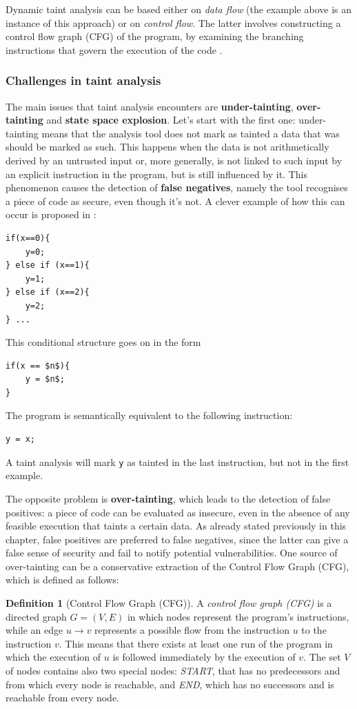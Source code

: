 \documentclass[12pt,a4paper]{book}
\theoremstyle{definition}
\newtheorem{defn}{Definition}
\begin{document}
	Dynamic taint analysis can be based either on \textit{data flow} (the example above is an instance of this approach) or on \textit{control flow}. The latter involves constructing a control flow graph (CFG) of the program, by examining the branching instructions that govern the execution of the code \cite{Dai2018}.
	
	\subsubsection{Challenges in taint analysis}
	The main issues that taint analysis encounters are \textbf{under-tainting}, \textbf{over-tainting} and \textbf{state space explosion}. Let's start with the first one: under-tainting means that the analysis tool does not mark as tainted a data that was should be marked as such. This happens when the data is not arithmetically derived by an untrusted input or, more generally, is not linked to such input by an explicit instruction in the program, but is still influenced by it. This phenomenon causes the detection of \textbf{false negatives}, namely the tool recognises a piece of code as secure, even though it's not. A clever example of how this can occur is proposed in \cite{Newsome2005}:
	\begin{lstlisting}
if(x==0){
	y=0;
} else if (x==1){
	y=1;
} else if (x==2){
	y=2;
} ...
	\end{lstlisting}
	This conditional structure goes on in the form
\begin{lstlisting}[mathescape=true]
if(x == $n$){
	y = $n$;
}
\end{lstlisting}
	The program is semantically equivalent to the following instruction:
	\begin{lstlisting}
y = x;
	\end{lstlisting}
	A taint analysis will mark \texttt{y} as tainted in the last instruction, but not in the first example.
	
	The opposite problem is \textbf{over-tainting}, which leads to the detection of false positives: a piece of code can be evaluated as insecure, even in the absence of any feasible execution that taints a certain data. As already stated previously in this chapter, false positives are preferred to false negatives, since the latter can give a false sense of security and fail to notify potential vulnerabilities. One source of over-tainting can be a conservative extraction of the Control Flow Graph (CFG), which is defined as follows:
	\begin{defn}[Control Flow Graph (CFG)]
		A \textit{control flow graph (CFG)} is a directed graph $G=(V,E)$ in which nodes represent the program's instructions, while an edge $u \rightarrow v$ represents a possible flow from the instruction $u$ to the instruction $v$. This means that there exists at least one run of the program in which the execution of $u$ is followed immediately by the execution of $v$. The set $V$ of nodes contains also two special nodes: \textit{START}, that has no predecessors and from which every node is reachable, and \textit{END}, which has no successors and is reachable from every node.
	\end{defn}
	
\end{document}
